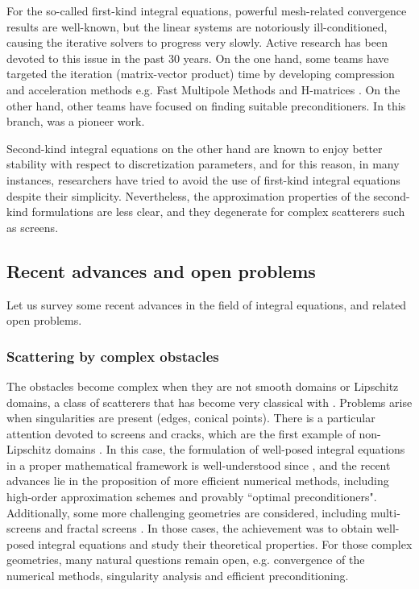 \documentclass[]{article}
\begin{document}
For the so-called first-kind integral equations, powerful mesh-related convergence results are well-known, but the linear systems are notoriously ill-conditioned, causing the iterative solvers to progress very slowly. Active research has been devoted to this issue in the past 30 years. On the one hand, some teams have targeted the iteration (matrix-vector product) time by developing compression and acceleration methods e.g. Fast Multipole Methods \cite{greengard1987fast} and H-matrices \cite{hackbusch1999sparse}. On the other hand, other teams have focused on finding suitable preconditioners. In this branch, \cite{steinbach1998construction} was a pioneer work. 

Second-kind integral equations on the other hand are known to enjoy better stability with respect to discretization parameters, and for this reason, in many instances, researchers have tried to avoid the use of first-kind integral equations despite their simplicity. Nevertheless, the approximation properties of the second-kind formulations are less clear, and they degenerate for complex scatterers such as screens. 


\subsection*{Recent advances and open problems}

Let us survey some recent advances in the field of integral equations, and related open problems.

\subsubsection*{Scattering by complex obstacles}

The obstacles become complex when they are not smooth domains or Lipschitz domains, a class of scatterers that has become very classical with \cite{mclean2000strongly}. Problems arise when singularities are present (edges, conical points). There is a particular attention devoted to screens and cracks, which are the first example of non-Lipschitz domains \cite{bruno2013high,gimperlein2019optimal,hiptmair2018closed,hiptmair2019preconditioning,hiptmair2020optimal,hiptmair2020compact,ramaciotti2017some}. In this case, the formulation of well-posed integral equations in a proper mathematical framework is well-understood since \cite{stephan1984augmented,wendland1990hypersingular}, and the recent advances lie in the proposition of more efficient numerical methods, including high-order approximation schemes and provably ``optimal preconditioners". Additionally, some more challenging geometries are considered, including multi-screens \cite{claeys2013integral,claeys2020quotient} and fractal screens \cite{chandlerWilde2017sobolev}. In those cases, the achievement was to obtain well-posed integral equations and study their theoretical properties. For those complex geometries, many natural questions remain open, e.g. convergence of the numerical methods, singularity analysis and efficient preconditioning. 
\end{document}
